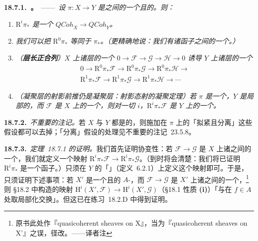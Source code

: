 \textbf{18.7.1.\ \trhTheorem。}\ ——\ \emph{设 $\pi\colon X\to Y$ 是\trScheme{}之间的一个\trQuasicompact{}且\trSeparated{}的\trMorphism。则：}
\begin{enumerate}[label=(\alph*),leftmargin=2.6em,itemsep=2pt,topsep=3pt]
\item \emph{$\mathrm{R}^i\pi_*$ 是一个\trCovariantFunctor{} $\mathit{QCoh}_X\to\mathit{QCoh}_Y$。}
\item \emph{我们可以把 $\mathrm{R}^0\pi_*$ 等同于 $\pi_*$。（更精确地说：我们有诸函子之间的一个\trNaturalIsomorphism。）}
\item \emph{（\textbf{\trHigherPushforward{}层长正合列}）$X$ 上诸层的一个\trShortExactSequence{} $0\to\mathscr{F}\to\mathscr{G}\to\mathscr{H}\to 0$ 诱导 $Y$ 上诸层的一个\trLongExactSequence}
\begin{equation*}\tag{18.7.1.1}\label{eq:les-higher-pushforward}
\begin{gathered}
0\longrightarrow\mathrm{R}^0\pi_*\mathscr{F}\longrightarrow\mathrm{R}^0\pi_*\mathscr{G}\longrightarrow\mathrm{R}^0\pi_*\mathscr{H}\longrightarrow\\
\mathrm{R}^1\pi_*\mathscr{F}\longrightarrow\mathrm{R}^1\pi_*\mathscr{G}\longrightarrow\mathrm{R}^1\pi_*\mathscr{H}\longrightarrow\cdots
\end{gathered}
\end{equation*}
\item \emph{（凝聚层的射影前推仍是凝聚层：射影态射的\trGrothendieck{}凝聚定理）若 $\pi$ 是一个\trProjective\trMorphism，$Y$ 是局部\trNoetherian{}的，而 $\mathscr{F}$ 是 $X$ 上的一个\trCoherentSheaf，则对一切 $i$，$\mathrm{R}^i\pi_*\mathscr{F}$ 是 $Y$ 上的一个\trCoherentSheaf。}
\end{enumerate}

\textbf{18.7.2.}\ \emph{不重要的注记。}\quad 若 $X$ 与 $Y$ 都是\trNoetherian{}的，则施加在 $\pi$ 上的「拟紧且分离」这些假设都可以去掉；「分离」假设的处理见\mbox{不重要的注记~23.5.8}。

\textbf{18.7.3.}\ \emph{\mbox{定理~18.7.1} 的证明。}\quad 我们首先证明协变性：若 $\mathscr{F}\to\mathscr{G}$ 是 $X$ 上诸\trQCSheaf{}之间的一个\trMorphism，我们就定义一个映射 $\mathrm{R}^i\pi_*\mathscr{F}\to\mathrm{R}^i\pi_*\mathscr{G}$。（到时将会清楚：我们将已证明 $\mathrm{R}^i\pi_*$ 是一个函子。）只须在 $Y$ 的「\trDistinguishedAffineBase」（\mbox{定义~6.2.1}）上定义这个映射即可。于是，只须证明下述事项：若 $X'$ 是一个\trQuasicompact{}且\trSeparated{}的 $A$-\trScheme，而 $\mathscr{F}\to\mathscr{G}$ 是 $X'$ 上诸\trQCSheaf{}之间的一个\trMorphism，\footnote{原书此处作『quasicoherent sheaves on X』，当为『quasicoherent sheaves on X'』之误，径改。——译者注}则 \S18.2 中构造的映射 $\mathrm{H}^i(X',\mathscr{F})\to\mathrm{H}^i(X',\mathscr{G})$（\S18.1 性质 \textbf{(i)}）「与在 $f\in A$ 处取局部化交换」。但这已在\mbox{练习~18.2.D} 中得到证明。

